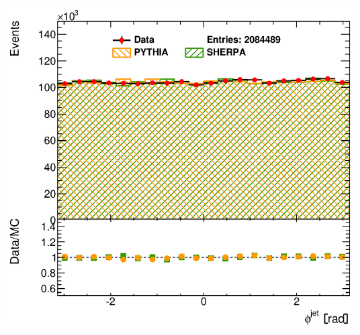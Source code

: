 \documentclass[12pt, twoside]{article}
\numberwithin{equation}{section}
\numberwithin{figure}{section}
\newenvironment{changemargin}[2]{%
\begin{list}{}{%
\setlength{\topsep}{0pt}%
\setlength{\leftmargin}{#1}%
\setlength{\rightmargin}{#2}%
\setlength{\listparindent}{\parindent}%
\setlength{\itemindent}{\parindent}%
\setlength{\parsep}{\parskip}%
}%
\item[]}{\end{list}}
\begin{document}
\begin{figure}
\begin{changemargin}{-1.0cm}{-0.75cm}
\begin{changemargin}{-0.75cm}{-1.0cm}
\begin{subfigure}[b]{0.37\textwidth}
            \subcaption{}
            \label{fig:DefaultRapidityJet}
        \end{subfigure}
        \begin{subfigure}[b]{0.37\textwidth}
            \includegraphics[width=\textwidth]{./images/Results(Default)/DEF-106.eps}
            \subcaption{}
            \label{fig:DefaultPhiJet}
        \end{subfigure}


\end{changemargin}
\end{changemargin}
\end{figure}
\end{document}
